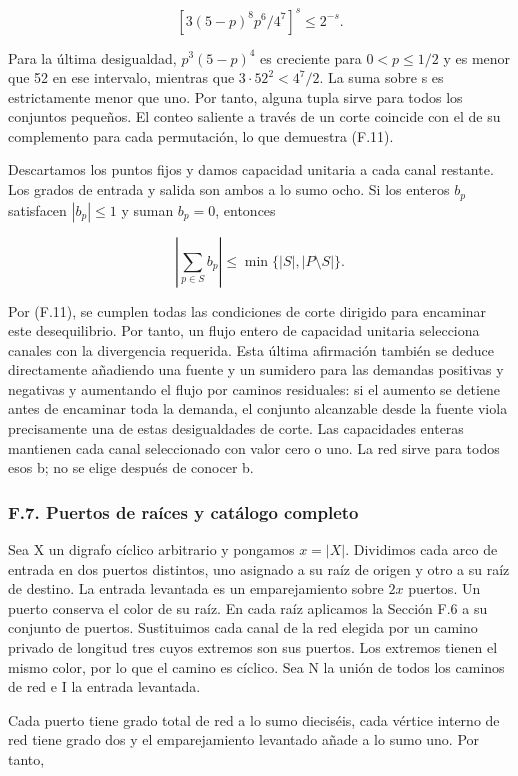 \documentclass[spanish,11pt,a4paper]{article}
\begin{document}
\[\left[3(5-p)^8p^6/4^7\right]^s\le2^{-s}.\]

Para la última desigualdad, \(p^{3}(5-p)^{4}\) es creciente para \(0<p\le 1/2\) y es menor que 52 en ese intervalo, mientras que \(3\cdot 52^{2}<4^{7}/2\). La suma sobre s es estrictamente menor que uno. Por tanto, alguna tupla sirve para todos los conjuntos pequeños. El conteo saliente a través de un corte coincide con el de su complemento para cada permutación, lo que demuestra (F.11).

Descartamos los puntos fijos y damos capacidad unitaria a cada canal restante. Los grados de entrada y salida son ambos a lo sumo ocho. Si los enteros \(b_{p}\) satisfacen \(|b_{p}|\le 1\) y suman \(b_{p}=0\), entonces

\[\left|\sum_{p\in S}b_p\right|\le\min\{|S|,|P\setminus S|\}.\]

Por (F.11), se cumplen todas las condiciones de corte dirigido para encaminar este desequilibrio. Por tanto, un flujo entero de capacidad unitaria selecciona canales con la divergencia requerida. Esta última afirmación también se deduce directamente añadiendo una fuente y un sumidero para las demandas positivas y negativas y aumentando el flujo por caminos residuales: si el aumento se detiene antes de encaminar toda la demanda, el conjunto alcanzable desde la fuente viola precisamente una de estas desigualdades de corte. Las capacidades enteras mantienen cada canal seleccionado con valor cero o uno. La red sirve para todos esos b; no se elige después de conocer b.

\subsubsection{F.7. Puertos de raíces y catálogo completo}\label{f.7.-puertos-de-rauxedces-y-catuxe1logo-completo}

Sea X un digrafo cíclico arbitrario y pongamos \(x=|X|\). Dividimos cada arco de entrada en dos puertos distintos, uno asignado a su raíz de origen y otro a su raíz de destino. La entrada levantada es un emparejamiento sobre \(2x\) puertos. Un puerto conserva el color de su raíz. En cada raíz aplicamos la Sección F.6 a su conjunto de puertos. Sustituimos cada canal de la red elegida por un camino privado de longitud tres cuyos extremos son sus puertos. Los extremos tienen el mismo color, por lo que el camino es cíclico. Sea N la unión de todos los caminos de red e I la entrada levantada.

Cada puerto tiene grado total de red a lo sumo dieciséis, cada vértice interno de red tiene grado dos y el emparejamiento levantado añade a lo sumo uno. Por tanto,
\end{document}
